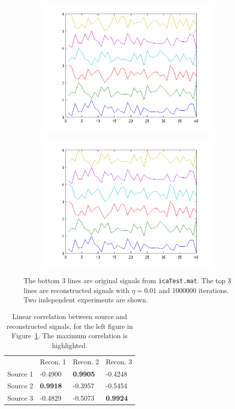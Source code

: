 \documentclass[10pt]{article}
\begin{document}
\begin{figure}[h]
\centering
\begin{subfigure}{0.49\textwidth}
	\includegraphics[width=\textwidth]{rep5.png}
\end{subfigure}
\begin{subfigure}{0.49\textwidth}
	\includegraphics[width=\textwidth]{rep6.png}
\end{subfigure}
\caption{The bottom 3 lines are original signals from
\texttt{icaTest.mat}. The top 3 lines are reconstructed signals with $\eta
= 0.01$ and 1000000 iterations. Two independent experiments are shown.}
\label{fig:rep}
\end{figure}

\begin{table}
\centering
\begin{tabular}{ | l l l l | }
\hline
& Recon. 1& Recon. 2& Recon. 3\\
Source 1&-0.4900& \textbf{0.9905}& -0.4248\\
Source 2&\textbf{0.9918}& -0.3957& -0.5454\\
Source 3&-0.4829& -0.5073& \textbf{0.9924}\\
\hline
\end{tabular}
\caption{Linear correlation between source and reconstructed signals, for
the left figure in Figure~\ref{fig:rep}. The maximum correlation is
highlighted.}
\label{tbl:corr1}
\end{table}
\end{document}
